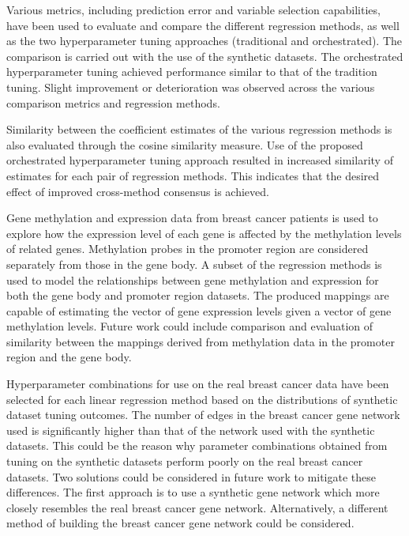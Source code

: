 Various metrics, including prediction error and variable selection capabilities, have been used to evaluate and compare the different regression methods, as well as the two hyperparameter tuning approaches (traditional and orchestrated). The comparison is carried out with the use of the synthetic datasets. The orchestrated hyperparameter tuning achieved performance similar to that of the tradition tuning. Slight improvement or deterioration was observed across the various comparison metrics and regression methods.

Similarity between the coefficient estimates of the various regression methods is also evaluated through the cosine similarity measure. Use of the proposed orchestrated hyperparameter tuning approach resulted in increased similarity of estimates for each pair of regression methods. This indicates that the desired effect of improved cross-method consensus is achieved.

Gene methylation and expression data from breast cancer patients is used to explore how the expression level of each gene is affected by the methylation levels of related genes. Methylation probes in the promoter region are considered separately from those in the gene body. A subset of the regression methods is used to model the relationships between gene methylation and expression for both the gene body and promoter region datasets. The produced mappings are capable of estimating the vector of gene expression levels given a vector of gene methylation levels. Future work could include comparison and evaluation of similarity between the mappings derived from methylation data in the promoter region and the gene body.

Hyperparameter combinations for use on the real breast cancer data have been selected for each linear regression method based on the distributions of synthetic dataset tuning outcomes. The number of edges in the breast cancer gene network used is significantly higher than that of the network used with the synthetic datasets. This could be the reason why parameter combinations obtained from tuning on the synthetic datasets perform poorly on the real breast cancer datasets. Two solutions could be considered in future work to mitigate these differences. The first approach is to use a synthetic gene network which more closely resembles the real breast cancer gene network. Alternatively, a different method of building the breast cancer gene network could be considered. 

